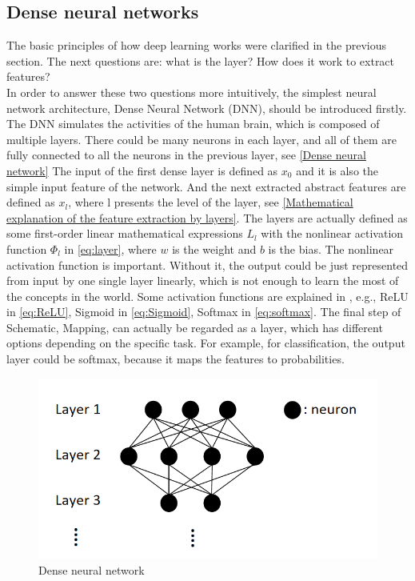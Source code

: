   \subsection{Dense neural networks}
  The basic principles of how deep learning works were clarified in the previous section. The next questions are: what is the layer? How does it work to extract features?\\
  In order to answer these two questions more intuitively, the simplest neural network architecture, Dense Neural Network (DNN)\cite{inproceedings}, should be introduced firstly. 
  The DNN simulates the activities of the human brain, which is composed of multiple layers. There could be many neurons in each layer, and all of them are fully connected to 
  all the neurons in the previous layer, see \autoref{Dense neural network}
  The input of the first dense layer is defined as $x_{0}$ and it is also the simple input feature of the network. And the next extracted abstract features are defined as $x_{l}$, 
  where l presents the level of the layer, see \autoref{Mathematical explanation of the feature extraction by layers}.
  The layers are actually defined as some first-order linear mathematical expressions $L _{l}$ with the nonlinear activation function $\Phi_{l}$ in \autoref{eq:layer}, 
  where $w$ is the weight and $b$ is the bias. The nonlinear activation function is important. Without it, the output could be just represented from input by one single layer linearly,
  which is not enough to learn the most of the concepts in the world. Some activation functions are explained in \cite{0706bf17a845490688ef4d7d19df65ba}, e.g., ReLU in \autoref{eq:ReLU}, 
  Sigmoid in \autoref{eq:Sigmoid}, Softmax in \autoref{eq:softmax}. The final step of Schematic, Mapping, can actually be regarded as a layer, which has different options depending on 
  the specific task. For example, for classification, the output layer could be softmax, because it maps the features to probabilities. 
  \begin{figure}
    \centering
    \includegraphics[width=0.6\linewidth]{example_images/DNN}
    \caption{Dense neural network}
    \label{Dense neural network}
  \end{figure}
